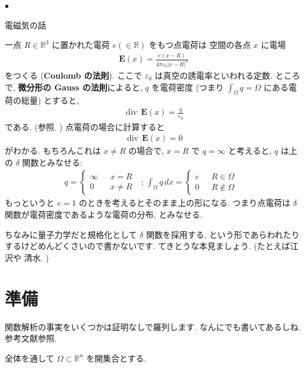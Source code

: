 \documentclass[openany, a4paper, oneside]{jsbook}
\newcounter{enum2}
\renewenvironment{itemize}{%
\begin{list}{$\bullet$\ \ }%
{%
\usecounter{enum2}
\setlength{\itemindent}{0pt}%
\setlength{\leftmargin}{15pt}%
\setlength{\rightmargin}{0pt}%
\setlength{\labelsep}{0pt}%
\setlength{\labelwidth}{6pt}%
\setlength{\itemsep}{0pt}%
\setlength{\parsep}{0pt}%
\setlength{\listparindent}{0pt}%
}
}{%
\end{list}%
}
\DeclareMathOperator{\divergence}{div \,}
\theoremstyle{break}
\theoremstyle{breakdefn}
\newcommand{\bbR}{\mathbb{R}}
\newcommand{\bbRthree}{\mathbb{R}^3}
\begin{document}
\begin{itemize}
\item 電磁気の話
\end{itemize}
一点 $R \in \bbRthree$ に置かれた電荷 $e (\in \bbR)$ をもつ点電荷は
空間の各点 $x$ に電場
\begin{align}
 \mathbf{E}(x)
 =
 \frac{e (x - R)}{4\pi \varepsilon_0 |x - R|^3}
\end{align}
をつくる (\textbf{Coulomb の法則}).
ここで $\varepsilon_0$ は真空の誘電率といわれる定数.
ところで, \textbf{微分形の Gauss の法則}によると,
$q$ を電荷密度 (つまり $\int_{\Omega}q = \Omega$ にある電荷の総量) とすると,
\begin{align}
 \divergence \mathbf{E}(x)
 =
 \frac{q}{\varepsilon_0}
\end{align}
である. (\cite{ShigenobuSunagawa2}参照. )
点電荷の場合に計算すると
\begin{align}
 \divergence \mathbf{E}(x) = 0
\end{align}
がわかる.
もちろんこれは $x \neq R$ の場合で,
$x = R$ で $q = \infty$ と考えると,
$q$ は上の $\delta$ 関数とみなせる:
\begin{align}
 q
 =
 \begin{cases}
  \infty & \text{ $x = R$ } \\
  0 & \text{ $x \neq R$ }
 \end{cases}; \,
 \int_{\Omega}q \, dx
 =
 \begin{cases}
  e & \text{ $R\in \Omega$ } \\
  0 & \text{ $R \not\in \Omega$ }
 \end{cases}
\end{align}
もっというと $e = 1$ のときを考えるとそのまま上の形になる.
つまり点電荷は $\delta$ 関数が電荷密度であるような電荷の分布, とみなせる.

ちなみに量子力学だと規格化として $\delta$ 関数を採用する,
という形であらわれたりするけどめんどくさいので書かないです.
てきとうな本見ましょう.
(たとえば江沢\cite{HiroshiEzawa3, HiroshiEzawa4}や
清水\cite{AkiraShimizu2}. )
\section{準備}


関数解析の事実をいくつかは証明なしで羅列します.
なんにでも書いてあるしね.
参考文献参照\cite{LiebLoss1, HisayaMasuda1, ShizuoMiyajima1, ShizuoMiyajima2}.

全体を通して $\Omega \subset \mathbb{R}^n$ を開集合とする.
\end{document}
